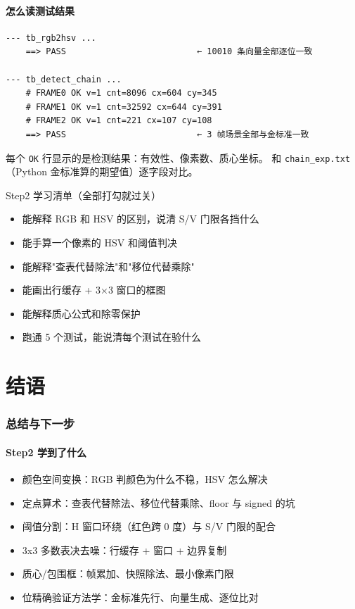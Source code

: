\documentclass[11pt]{ctexart}
\newcommand{\code}[1]{\texttt{#1}}
\begin{document}
\subsection{怎么读测试结果}

\begin{Verbatim}[frame=single,fontsize=\small]
--- tb_rgb2hsv ...
    ==> PASS                          ← 10010 条向量全部逐位一致

--- tb_detect_chain ...
    # FRAME0 OK v=1 cnt=8096 cx=604 cy=345
    # FRAME1 OK v=1 cnt=32592 cx=644 cy=391
    # FRAME2 OK v=1 cnt=221 cx=107 cy=108
    ==> PASS                          ← 3 帧场景全部与金标准一致
\end{Verbatim}

每个 \code{OK} 行显示的是检测结果：有效性、像素数、质心坐标。
和 \code{chain\_exp.txt}（Python 金标准算的期望值）逐字段对比。

\begin{okbox}{Step2 学习清单（全部打勾就过关）}
\begin{itemize}
  \item 能解释 RGB 和 HSV 的区别，说清 S/V 门限各挡什么
  \item 能手算一个像素的 HSV 和阈值判决
  \item 能解释"查表代替除法"和"移位代替乘除"
  \item 能画出行缓存 + 3×3 窗口的框图
  \item 能解释质心公式和除零保护
  \item 跑通 5 个测试，能说清每个测试在验什么
\end{itemize}
\end{okbox}



\clearpage
\part*{结语}
\section*{总结与下一步}

\subsection*{Step2 学到了什么}
\begin{itemize}
  \item 颜色空间变换：RGB 判颜色为什么不稳，HSV 怎么解决
  \item 定点算术：查表代替除法、移位代替乘除、floor 与 signed 的坑
  \item 阈值分割：H 窗口环绕（红色跨 0 度）与 S/V 门限的配合
  \item 3x3 多数表决去噪：行缓存 + 窗口 + 边界复制
  \item 质心/包围框：帧累加、快照除法、最小像素门限
  \item 位精确验证方法学：金标准先行、向量生成、逐位比对
\end{itemize}
\end{document}
